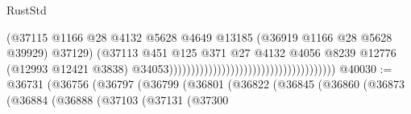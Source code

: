 \begin{lexlean}{RustStd}
\begin{coremodule}
                                                                              (@37115
                                                                                @1166
                                                                                @28
                                                                                @4132
                                                                                @5628
                                                                                @4649
                                                                                @13185
                                                                                (@36919
                                                                                  @1166
                                                                                  @28
                                                                                  @5628
                                                                                  @39929)
                                                                                @37129)
                                                                              (@37113
                                                                                @451
                                                                                @125
                                                                                @371
                                                                                @27
                                                                                @4132
                                                                                @4056
                                                                                @8239
                                                                                @12776
                                                                                (@12993
                                                                                  @12421
                                                                                  @3838)
                                                                                @34053))))))))))))))))))))))))))))))))))))))
@40030 := @36731
    (@36756
      (@36797
        (@36799
          (@36801
            (@36822
              (@36845
                (@36860
                  (@36873
                    (@36884
                      (@36888
                        (@37103
                          (@37131
                            (@37300

\end{coremodule}
\end{lexlean}
